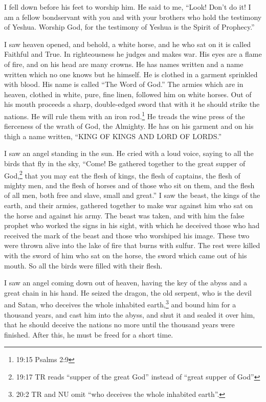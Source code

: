 \myverse{}I fell down before his feet to worship him. He said to me, “Look!
Don’t do it! I am a fellow bondservant with you and with your brothers who hold the testimony of Yeshua.
Worship God, for the testimony of Yeshua is the Spirit of Prophecy.”

\myverse{}I saw heaven opened, and behold, a white horse, and he who sat
on it is called Faithful and True. In righteousness he judges and makes war.
\myverse{}His eyes are a flame of fire, and on his head are many crowns. He has names
written and a name written which no one knows but he himself.
\myverse{}He is clothed in a garment sprinkled with blood. His name is called “The
Word of God.”
\myverse{}The armies which are in heaven, clothed in white, pure, fine linen, followed
him on white horses.
\myverse{}Out of his mouth proceeds a sharp, double-edged sword that with it he should
strike the nations. He will rule them with an iron rod.\footnote{19:15 Psalms 2:9} He treads the wine press of the fierceness of the wrath of God, the Almighty.
\myverse{}He has on his garment and on his thigh a name written, “KING OF KINGS AND
LORD OF LORDS.”

\myverse{}I saw an angel standing in the sun. He cried with a loud voice,
saying to all the birds that fly in the sky, “Come! Be gathered together to the great supper of God,\footnote{19:17 TR reads “supper of the great God” instead of “great supper of God”}
\myverse{}that you may eat the flesh of kings, the flesh of captains, the flesh of
mighty men, and the flesh of horses and of those who sit on them, and the flesh of all men, both free
and slave, small and great.”
\myverse{}I saw the beast, the kings of the earth, and their armies, gathered together
to make war against him who sat on the horse and against his army.
\myverse{}The beast was taken, and with him the false prophet who worked the signs
in his sight, with which he deceived those who had received the mark of the beast and those who worshiped
his image. These two were thrown alive into the lake of fire that burns with sulfur.
\myverse{}The rest were killed with the sword of him who sat on the horse, the sword
which came out of his mouth. So all the birds were filled with their flesh.



\mychapter{} \myverse*{}I saw an angel coming down out of heaven, having the key of the
abyss and a great chain in his hand.
\myverse{}He seized the dragon, the old serpent, who is the devil and Satan, who deceives
the whole inhabited earth,\footnote{20:2 TR and NU omit “who deceives the whole inhabited earth”.} and bound him for a thousand
years,
\myverse{}and cast him into the abyss, and shut it and sealed it over him, that he should
deceive the nations no more until the thousand years were finished. After this, he must be freed for a
short time.

